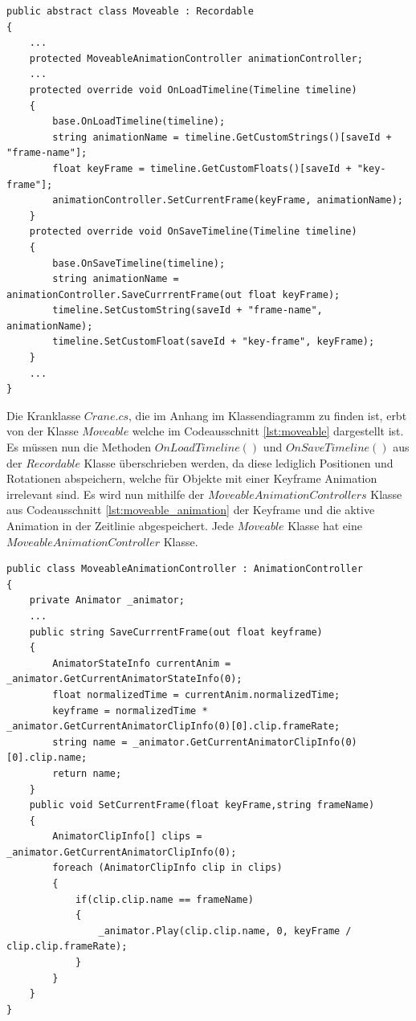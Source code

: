 \begin{lstlisting}[caption={Ausschnitt aus Moveable.cs}, label={lst:moveable}]
public abstract class Moveable : Recordable
{
    ...
    protected MoveableAnimationController animationController;
    ...
    protected override void OnLoadTimeline(Timeline timeline)
    {
        base.OnLoadTimeline(timeline);
        string animationName = timeline.GetCustomStrings()[saveId + "frame-name"];
        float keyFrame = timeline.GetCustomFloats()[saveId + "key-frame"];
        animationController.SetCurrentFrame(keyFrame, animationName);
    }
    protected override void OnSaveTimeline(Timeline timeline)
    {
        base.OnSaveTimeline(timeline);
        string animationName = animationController.SaveCurrrentFrame(out float keyFrame);
        timeline.SetCustomString(saveId + "frame-name", animationName);
        timeline.SetCustomFloat(saveId + "key-frame", keyFrame);
    }
    ...
}
\end{lstlisting}

Die Kranklasse $Crane.cs$, die im Anhang im Klassendiagramm zu finden ist, erbt von der Klasse $Moveable$ welche im Codeausschnitt \ref{lst:moveable} dargestellt ist. Es müssen nun die Methoden $OnLoadTimeline()$ und $OnSaveTimeline()$ aus der $Recordable$ Klasse überschrieben werden, da diese lediglich Positionen und Rotationen abspeichern, welche für Objekte mit einer Keyframe Animation irrelevant sind. Es wird nun mithilfe der $MoveableAnimationControllers$ Klasse aus Codeausschnitt \ref{lst:moveable_animation} der Keyframe und die aktive Animation in der Zeitlinie abgespeichert. Jede $Moveable$ Klasse hat eine $MoveableAnimationController$ Klasse.

\begin{lstlisting}[caption={Ausschnitt aus MoveableAnimationController.cs}, label={lst:moveable_animation}]
public class MoveableAnimationController : AnimationController
{
    private Animator _animator;
    ...
    public string SaveCurrrentFrame(out float keyframe)
    {
        AnimatorStateInfo currentAnim = _animator.GetCurrentAnimatorStateInfo(0);
        float normalizedTime = currentAnim.normalizedTime;
        keyframe = normalizedTime * _animator.GetCurrentAnimatorClipInfo(0)[0].clip.frameRate;
        string name = _animator.GetCurrentAnimatorClipInfo(0)[0].clip.name;
        return name;
    }
    public void SetCurrentFrame(float keyFrame,string frameName)
    {
        AnimatorClipInfo[] clips = _animator.GetCurrentAnimatorClipInfo(0);
        foreach (AnimatorClipInfo clip in clips)
        {
            if(clip.clip.name == frameName)
            {
                _animator.Play(clip.clip.name, 0, keyFrame / clip.clip.frameRate);
            }
        }
    }
}
\end{lstlisting}

